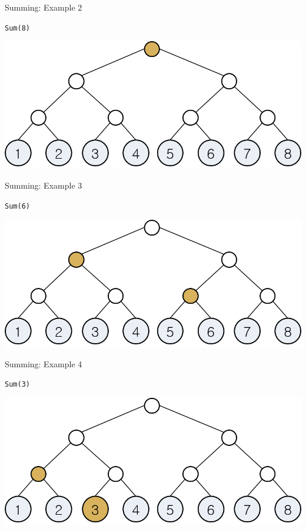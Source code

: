 \documentclass[13pt,onlymath]{beamer}
\begin{document}
\begin{frame}[fragile]{Summing: Example 2}
\BIT
\item \verb,Sum(8),
\EIT
\begin{center}
\includegraphics[height=0.4\textheight]{figures/fenwick_sum2.png}
\end{center}
\end{frame}

\begin{frame}[fragile]{Summing: Example 3}
\BIT
\item \verb,Sum(6),
\EIT
\begin{center}
\includegraphics[height=0.4\textheight]{figures/fenwick_sum3.png}
\end{center}
\end{frame}

\begin{frame}[fragile]{Summing: Example 4}
\BIT
\item \verb,Sum(3),
\EIT
\begin{center}
\includegraphics[height=0.4\textheight]{figures/fenwick_sum4.png}
\end{center}
\end{frame}
\end{document}
